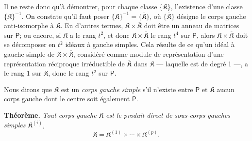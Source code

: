 Il ne reste donc qu'à démontrer, pour chaque classe \(\{\mathfrak K\}\), l'existence d'une classe \(\{\mathfrak K\}^{-1}\). On constate qu'il faut poser \(\{\mathfrak K\}^{-1}=\{\overline{\mathfrak K}\}\), où \(\{\overline{\mathfrak K}\}\) désigne le corps gauche anti-isomorphe à \(\mathfrak K\). En d'autres termes, \(\mathfrak K\times\overline{\mathfrak K}\) doit être un anneau de matrices sur \(\mathsf P\); ou encore, si \(\mathfrak K\) a le rang \(t^2\), et donc \(\mathfrak K\times\overline{\mathfrak K}\) le rang \(t^4\) sur \(\mathsf P\), alors \(\mathfrak K\times\overline{\mathfrak K}\) doit se décomposer en \(t^2\) idéaux à gauche simples. Cela résulte de ce qu'un idéal à gauche simple de \(\mathfrak K\times\overline{\mathfrak K}\), considéré comme module de représentation d'une représentation réciproque irréductible de \(\overline{\mathfrak K}\) dans \(\mathfrak K\) --- laquelle est de degré 1 ---, a le rang 1 sur \(\mathfrak K\), donc le rang \(t^2\) sur \(\mathsf P\).

Nous dirons que \(\mathfrak K\) est un \emph{corps gauche simple} s'il n'existe entre \(\mathsf P\) et \(\mathfrak K\) aucun corps gauche dont le centre soit également \(\mathsf P\).

\textbf{Théorème.} \emph{Tout corps gauche \(\mathfrak K\) est le produit direct de sous-corps gauches simples \(\mathfrak K^{(i)}\),}
\[
\mathfrak K=\mathfrak K^{(1)}\times\cdots\times\mathfrak K^{(p)}.
\]

